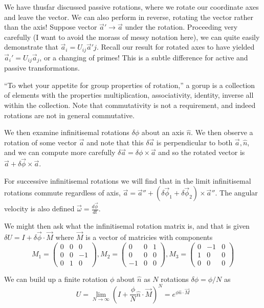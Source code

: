 \documentclass[10pt]{report}
\newcommand{\rd}[2]{\frac{d#1}{d#2}}
\begin{document}
We have thusfar discussed passive rotations, where we rotate our coordinate axes and leave the vector. We can also perform in reverse, rotating the vector rather than the axis! Suppose vector $\vec{a}' \to \vec{a}$ under the rotation. Proceeding very carefully (I want to avoid the morass of messy notation here), we can quite easily demonstrate that $\vec{a}_i = U_{ij}\vec{a}'j$. Recall our result for rotated axes to have yielded $\vec{a}_i' = U_{ij} \vec{a}_j$, or a changing of primes! This is a subtle difference for active and passive transformations. 

``To whet your appetite for group properties of rotation,'' a gorup is a collection of elements with the properties multiplication, associativity, identity, inverse all within the collection. Note that commutativity is not a requirement, and indeed rotations are not in general commutative. 

We then examine infinitisemal rotations $\delta \phi$ about an axis $\hat{n}$. We then observe a rotation of some vector $\vec{a}$ and note that this $\delta \vec{a}$ is perpendicular to both $\vec{a},\hat{n}$, and we can compute more carefully $\delta \vec{a} = \delta\phi \times \vec{a}$ and so the rotated vector is $\vec{a} + \delta\vec{\phi} \times \vec{a}$.

For successive infinitisemal rotations we will find that in the limit infinitisemal rotations commute regardless of axis, $\vec{a} = \vec{a}'' + (\delta \vec{\phi}_1 + \delta\vec{\phi}_2) \times \vec{a}''$. The angular velocity is also defined $\vec{\omega} = \rd{\vec{\phi}}{t}$.

We might then ask what the infinitisemal rotation matrix is, and that is given $\delta U = I + \delta\vec{\phi} \cdot \vec{M}$ where $\vec{M}$ is a vector of matricies with components
$$M_1 = \begin{pmatrix}0&0&0\\0&0&-1\\0&1&0\end{pmatrix}, M_2 = \begin{pmatrix}0&0&1\\0&0&0\\-1&0&0\end{pmatrix}, M_3 = \begin{pmatrix}0 & -1 & 0\\1 & 0 & 0\\0 & 0 & 0\end{pmatrix}$$

We can build up a finite rotation $\phi$ about $\hat{n}$ as $N$ rotations $\delta \phi = \phi/N$ as
$$U = \lim_{N \to \infty} \left( I + \frac{\phi}{N}\hat{n}\cdot\vec{M} \right)^N = e^{\phi \hat{n} \cdot \vec{M}}$$
\end{document}
